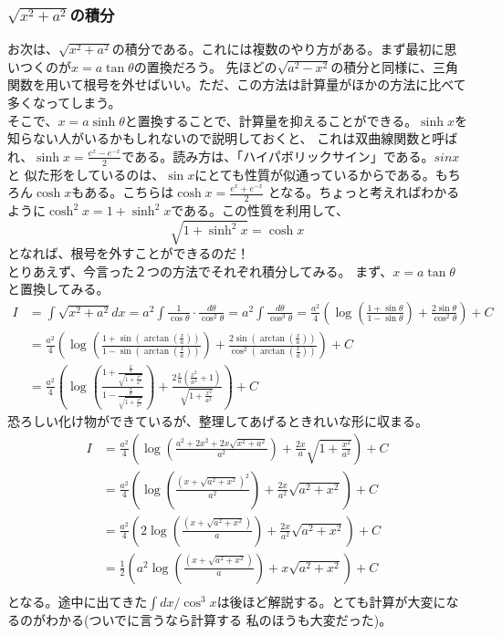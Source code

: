 \documentclass[a4j,dvipdfmx]{jsarticle}
\begin{document}
\subsubsection{$\sqrt{x^2+a^2}$の積分}
お次は、$\sqrt{x^2+a^2}$の積分である。これには複数のやり方がある。まず最初に思いつくのが$x=a\tan \theta$の置換だろう。
先ほどの$\sqrt{a^2-x^2}$の積分と同様に、三角関数を用いて根号を外せばいい。ただ、この方法は計算量がほかの方法に比べて多くなってしまう。\\

そこで、$x=a\sinh \theta$と置換することで、計算量を抑えることができる。$\sinh x$を知らない人がいるかもしれないので説明しておくと、
これは双曲線関数と呼ばれ、$\displaystyle \sinh x=\frac{e^x-e^{-x}}{2}$である。読み方は、「ハイパボリックサイン」である。$sin x$と
似た形をしているのは、$\sin x$にとても性質が似通っているからである。もちろん$\cosh x$もある。こちらは$\displaystyle \cosh x=\frac{e^x+e^{-x}}{2}$
となる。ちょっと考えればわかるように$\cosh^2 x=1+\sinh^2 x$である。この性質を利用して、
\begin{equation*}
    \sqrt{1+\sinh^2 x}=\cosh x
\end{equation*}
となれば、根号を外すことができるのだ！\\

とりあえず、今言った２つの方法でそれぞれ積分してみる。
\newpage
まず、$x=a\tan\theta$と置換してみる。
\begin{align*}
    I&=\int \sqrt{x^2+a^2}dx=a^2\int \frac{1}{\cos \theta}\cdot\frac{d\theta}{\cos^2 \theta}
    =a^2\int\frac{d\theta}{\cos^3\theta}=\frac{a^2}{4}\left(\log\left(\frac{1+\sin\theta}{1-\sin\theta}\right)
    +\frac{2\sin \theta}{\cos^2 \theta}\right)+C\\
    &=\frac{a^2}{4}\left(\log\left(\frac{1+\sin(\arctan(\frac{x}{a}))}{1-\sin(\arctan(\frac{x}{a}))}\right)
    +\frac{2\sin(\arctan(\frac{x}{a}))}{\cos^2(\arctan(\frac{x}{a}))}\right)+C\\
    &=\frac{a^2}{4}\left(\log\left(\frac{1+\frac{\frac{x}{a}}{\sqrt{1+\frac{x^2}{a^2}}}}{1-\frac{\frac{x}{a}}{\sqrt{1+\frac{x^2}{a^2}}}}\right)
    +\frac{2\frac{x}{a}(\frac{x^2}{a^2}+1)}{\sqrt{1+\frac{x^2}{a^2}}}\right)+C
\end{align*}
恐ろしい化け物ができているが、整理してあげるときれいな形に収まる。
\begin{align*}
    I&=\frac{a^2}{4}\left(\log\left(\frac{a^2+2x^2+2x\sqrt{x^2+a^2}}{a^2}\right)
    +\frac{2x}{a}\sqrt{1+\frac{x^2}{a^2}}\right)+C\\
    &=\frac{a^2}{4}\left(\log\left(\frac{(x+\sqrt{a^2+x^2})^2}{a^2}\right)
    +\frac{2x}{a^2}\sqrt{a^2+x^2}\right)+C\\
    &=\frac{a^2}{4}\left(2\log\left(\frac{(x+\sqrt{a^2+x^2})}{a}\right)
    +\frac{2x}{a^2}\sqrt{a^2+x^2}\right)+C\\
    &=\frac{1}{2}\left(a^2\log\left(\frac{(x+\sqrt{a^2+x^2})}{a}\right)
    +x\sqrt{a^2+x^2}\right)+C\\
\end{align*}
となる。途中に出てきた$\int dx/\cos^3x$は後ほど解説する。とても計算が大変になるのがわかる(ついでに言うなら計算する
私のほうも大変だった)。
\end{document}
